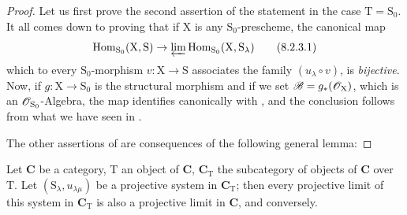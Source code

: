 \begin{proof}
Let us first prove the second assertion of the statement in the case $\mathrm{T}=\mathrm{S}_0$.
It all comes down to proving that if $\mathrm{X}$ is any $\mathrm{S}_0$-prescheme, the canonical map
\begin{equation}
  \operatorname{Hom}_{\mathrm{S}_0}(\mathrm{X},\mathrm{S})\to\varprojlim\operatorname{Hom}_{\mathrm{S}_0}(\mathrm{X},\mathrm{S}_\lambda)
  \tag{8.2.3.1}
\label{IV.8.2.3.1}
\end{equation}
which to every $\mathrm{S}_0$-morphism $v:\mathrm{X}\to\mathrm{S}$ associates the family $(u_\lambda\circ v)$, is \emph{bijective}.
Now, if $g:\mathrm{X}\to\mathrm{S}_0$ is the structural morphism and if we set $\mathscr{B}=g_*(\mathscr{O}_\mathrm{X})$, which is an $\mathscr{O}_{\mathrm{S}_0}$-Algebra, the map  identifies canonically with  , and the conclusion follows from what we have seen in .

The other assertions of  are consequences of the following general lemma:
\end{proof}

\begin{lemma}[8.2.4]
\label{IV.8.2.4}
Let $\mathbf{C}$ be a category, $\mathrm{T}$ an object of $\mathbf{C}$, $\mathbf{C}_\mathrm{T}$ the subcategory of objects of $\mathbf{C}$ over $\mathrm{T}$.
Let $(\mathrm{S}_\lambda,u_{\lambda\mu})$ be a projective system in $\mathbf{C}_\mathrm{T}$; then every projective limit of this system in $\mathbf{C}_\mathrm{T}$ is also a projective limit in $\mathbf{C}$, and conversely.
\end{lemma}


